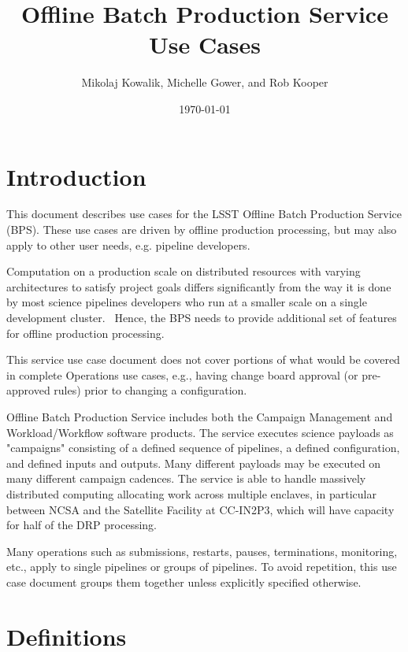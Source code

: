 \documentclass[DM,lsstdraft,toc]{lsstdoc}
\title{Offline Batch Production Service Use Cases}
\author{Mikolaj Kowalik, Michelle Gower, and Rob Kooper}
\date{\today}
\begin{document}
\maketitle

\section{Introduction}

This document describes use cases for the LSST Offline Batch Production
Service (BPS).  These use cases are driven by offline production
processing, but may also apply to other user needs, e.g. pipeline
developers.

Computation on a production scale on distributed resources with varying
architectures to satisfy project goals differs significantly from the
way it is done by most science pipelines developers who run at a smaller
scale on a single development cluster.  Hence, the BPS needs to provide
additional set of features for offline production processing.

This service use case document does not cover portions of what would be
covered in complete Operations use cases, e.g., having change board
approval (or pre-approved rules) prior to changing a configuration.    

Offline Batch Production Service includes both the Campaign Management and
Workload/Workflow software products.  The service executes science payloads as
"campaigns" consisting of a defined sequence of pipelines, a defined
configuration, and defined inputs and outputs.  Many different payloads may be
executed on many different campaign cadences.  The service is able to handle
massively distributed computing allocating work across multiple enclaves, in
particular between NCSA and the Satellite Facility at CC-IN2P3, which will have
capacity for half of the DRP processing.

Many operations such as submissions, restarts, pauses, terminations,
monitoring, etc., apply to single pipelines or groups of pipelines.  To avoid
repetition, this use case document groups them together unless explicitly
specified otherwise.

\section{Definitions}
\end{document}
